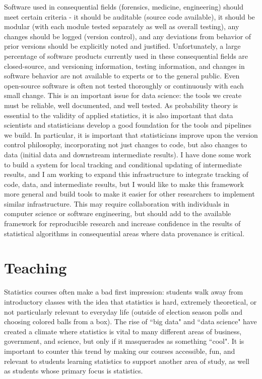\documentclass[12pt, letterpaper, sans]{moderncv}
\begin{document}
Software used in consequential fields (forensics, medicine, engineering) should meet certain criteria - it should be auditable (source code available), it should be modular (with each module tested separately as well as overall testing), any changes should be logged (version control), and any deviations from behavior of prior versions should be explicitly noted and justified. Unfortunately, a large percentage of software products currently used in these consequential fields are closed-source, and versioning information, testing information, and changes in software behavior are not available to experts or to the general public. Even open-source software is often not tested thoroughly or continuously with each small change. This is an important issue for data science: the tools we create must be reliable, well documented, and well tested. As probability theory is essential to the validity of applied statistics, it is also important that data scientists and statisticians develop a good foundation for the tools and pipelines we build. In particular, it is important that statisticians improve upon the version control philosophy, incorporating not just changes to code, but also changes to data (initial data and downstream intermediate results). I have done some work to build a system for local tracking and conditional updating of intermediate results, and I am working to expand this infrastructure to integrate tracking of code, data, and intermediate results, but I would like to make this framework more general and build tools to make it easier for other researchers to implement similar infrastructure. This may require collaboration with individuals in computer science or software engineering, but should add to the available framework for reproducible research and increase confidence in the results of statistical algorithms in consequential areas where data provenance is critical. 
\clearpage
\section{Teaching}

Statistics courses often make a bad first impression: students walk away from introductory classes with the idea that statistics is hard, extremely theoretical, or not particularly relevant to everyday life (outside of election season polls and choosing colored balls from a box). The rise of ``big data" and ``data science" have created a climate where statistics is vital to many different areas of business, government, and science, but only if it masquerades as something ``cool". It is important to counter this trend by making our courses accessible, fun, and relevant to students learning statistics to support another area of study, as well as students whose primary focus is statistics. 
\end{document}

